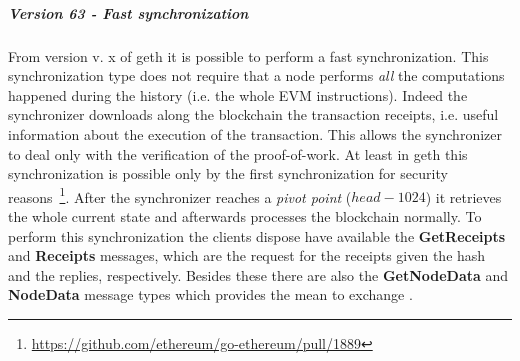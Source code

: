 \subparagraph{Version 63 - Fast synchronization}
From version v. x of geth it is possible to perform a fast synchronization.
This synchronization type does not require that a node performs \emph{all} the
computations happened during the history (i.e. the whole EVM instructions).
Indeed the synchronizer downloads along the blockchain the transaction receipts,
i.e. useful information about the execution of the transaction.
This allows the synchronizer to deal only with the verification of the
proof-of-work. At least in geth this synchronization is possible only by the
first synchronization for security
reasons~\footnote{\url{https://github.com/ethereum/go-ethereum/pull/1889}}.
After the synchronizer reaches a \textit{pivot point} ($head - 1024$) it
retrieves the whole current state and afterwards processes the blockchain
normally.
To perform this synchronization the clients dispose have available
the \textbf{GetReceipts} and \textbf{Receipts} messages, which are the
request for the receipts given the hash and the replies, respectively.
Besides these there are also the \textbf{GetNodeData} and
\textbf{NodeData} message types which provides the mean to exchange
.




